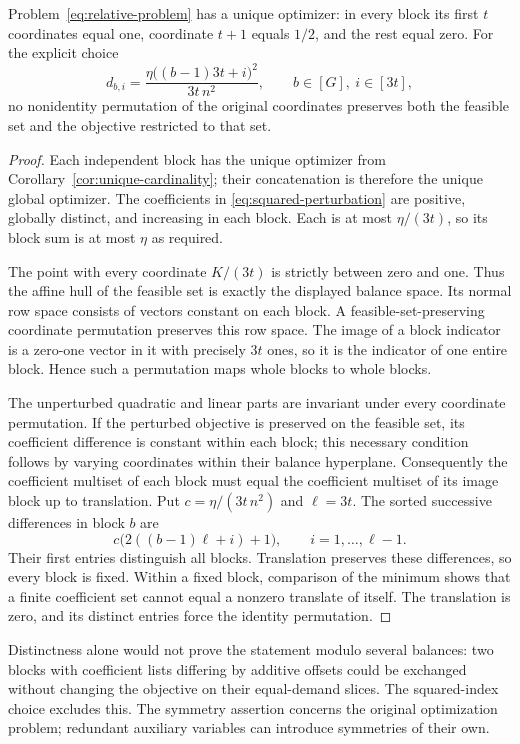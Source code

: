 \begin{proposition}
\label{prop:relative-asymmetry}
Problem~\eqref{eq:relative-problem} has a unique optimizer: in every
block its first $t$ coordinates equal one, coordinate $t+1$ equals
$1/2$, and the rest equal zero. For the explicit choice
\begin{equation}\label{eq:squared-perturbation}
 d_{b,i}=\frac{\eta\bigl((b-1)3t+i\bigr)^2}{3t\,n^2},
 \qquad b\in[G],\ i\in[3t],
\end{equation}
no nonidentity permutation of the original coordinates preserves both
the feasible set and the objective restricted to that set.
\end{proposition}
\begin{proof}
Each independent block has the unique optimizer from
Corollary~\ref{cor:unique-cardinality}; their concatenation is therefore
the unique global optimizer. The coefficients in
\eqref{eq:squared-perturbation} are positive, globally distinct, and
increasing in each block. Each is at most $\eta/(3t)$, so its block
sum is at most $\eta$ as required.

The point with every coordinate $K/(3t)$ is strictly between zero and
one. Thus the affine hull of the feasible set is exactly the displayed
balance space. Its normal row space consists of vectors constant on each
block. A feasible-set-preserving coordinate permutation preserves this
row space. The image of a block indicator is a zero-one vector in it
with precisely $3t$ ones, so it is the indicator of one entire block.
Hence such a permutation maps whole blocks to whole blocks.

The unperturbed quadratic and linear parts are invariant under every
coordinate permutation. If the perturbed objective is preserved on the
feasible set, its coefficient difference is constant within each block;
this necessary condition follows by varying coordinates within their
balance hyperplane. Consequently the coefficient multiset of each block
must equal the coefficient multiset of its image block up to translation.
Put $c=\eta/(3t\,n^2)$ and $\ell=3t$. The sorted successive differences
in block $b$ are
\[
 c\bigl(2((b-1)\ell+i)+1\bigr),\qquad i=1,\ldots,\ell-1.
\]
Their first entries distinguish all blocks. Translation preserves these
differences, so every block is fixed. Within a fixed block, comparison
of the minimum shows that a finite coefficient set cannot equal a
nonzero translate of itself. The translation is zero, and its distinct
entries force the identity permutation.
\end{proof}
Distinctness alone would not prove the statement modulo several balances:
two blocks with coefficient lists differing by additive offsets could be
exchanged without changing the objective on their equal-demand slices.
The squared-index choice excludes this. The symmetry assertion concerns
the original optimization problem; redundant auxiliary variables can
introduce symmetries of their own.

